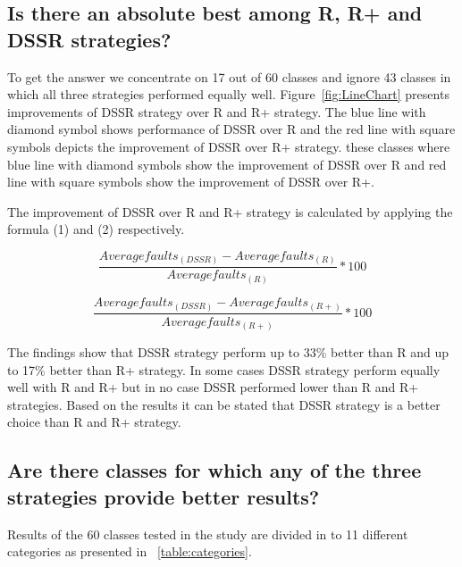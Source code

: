 \documentclass{acm_proc_article-sp}
\begin{document}
\subsection{Is there an absolute best among R, R+ and DSSR strategies?}
To get the answer we concentrate on 17 out of 60 classes and ignore 43 classes in which all three strategies performed equally well. Figure~\ref{fig:LineChart} presents improvements of DSSR strategy over R and R+ strategy. The blue line with diamond symbol shows performance of DSSR over R and the red line with square symbols depicts the improvement of DSSR over R+ strategy. these classes where blue line with diamond symbols show the improvement of DSSR over R and red line with square symbols show the improvement of DSSR over R+. 

The improvement of DSSR over R and R+ strategy is calculated by applying the formula (1) and (2) respectively.

\begin{equation} \frac{Averagefaults_{(DSSR)} - Averagefaults_{(R)}}{Averagefaults_{(R)}} * 100  \end{equation}

\begin{equation} \frac{Averagefaults_{(DSSR)} - Averagefaults_{(R+)}}{Averagefaults_{(R+)}}  * 100 \end{equation}

The findings show that DSSR strategy perform up to 33\% better than R and up to 17\% better than R+ strategy. In some cases DSSR strategy perform equally well with R and R+ but in no case DSSR performed lower than R and R+ strategies. Based on the results it can be stated that DSSR strategy is a better choice than R and R+ strategy. 

\subsection{Are there classes for which any of the three strategies provide better results?}

Results of the 60 classes tested in the study are divided in to 11 different categories as presented in ~\ref{table:categories}. 
\end{document}

